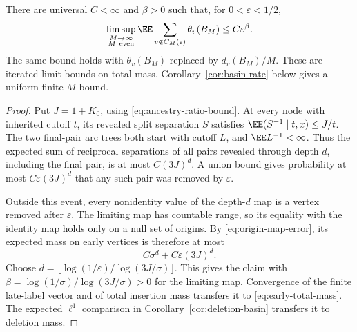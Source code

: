 \documentclass[11pt,letterpaper]{article}
\begin{document}
\begin{corollary}
\label{cor:early-total-mass}
There are universal $C<\infty$ and $\beta>0$ such that, for
$0<\varepsilon<1/2$,
\begin{equation}\label{eq:early-total-mass}
 \limsup_{\substack{M\to\infty\\M\ {\rm even}}}
 \EE\sum_{v\notin C_M(\varepsilon)}\theta_v(B_M)
 \le C\varepsilon^\beta.
\end{equation}
The same bound holds with $\theta_v(B_M)$ replaced by $d_v(B_M)/M$.
These are iterated-limit bounds on total mass.
Corollary~\ref{cor:basin-rate} below gives a uniform finite-$M$ bound.
\end{corollary}
\begin{proof}
Put $J=1+K_0$, using \eqref{eq:ancestry-ratio-bound}.
At every node with inherited cutoff $t$, its revealed split separation
$S$ satisfies $\EE(S^{-1}\mid t,x)\le J/t$.
The two final-pair arc trees both start with cutoff $L$, and
$\EE L^{-1}<\infty$. Thus the expected sum of reciprocal separations
of all pairs revealed through depth $d$, including the final pair,
is at most $C(3J)^d$. A union bound gives probability at most
$C\varepsilon(3J)^d$ that any such pair was removed by
$\varepsilon$.

Outside this event, every nonidentity value of the depth-$d$ map is
a vertex removed after $\varepsilon$.
The limiting map has countable range, so its equality with the identity
map holds only on a null set of origins. By
\eqref{eq:origin-map-error}, its expected mass on early vertices is
therefore at most
\[
 C\sigma^d+C\varepsilon(3J)^d.
\]
Choose $d=\lfloor\log(1/\varepsilon)/\log(3J/\sigma)\rfloor$.
This gives the claim with
$\beta=\log(1/\sigma)/\log(3J/\sigma)>0$ for the limiting map.
Convergence of the finite late-label vector and of total insertion
mass transfers it to \eqref{eq:early-total-mass}.
The expected $\ell^1$ comparison in
Corollary~\ref{cor:deletion-basin} transfers it to deletion mass.
\end{proof}
\end{document}

